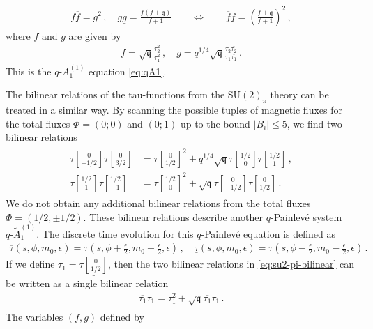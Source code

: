 \documentclass[11pt, a4paper]{article}
\newcommand{\tauftn}[2]{\tau\genfrac[]{0pt}{1}{#1}{#2}}
\theoremstyle{definition}
\begin{document}
\begin{align}
    f\overline{f} = g^2 \, , \quad
    g\underline{g} = \frac{f(f+\mathfrak{q})}{f+1} \qquad \Leftrightarrow \qquad
    \overline{f}\underline{f} = \left( \frac{f+\mathfrak{q}}{f+1} \right)^2 \, ,
\end{align}
where $ f $ and $ g $ are given by
\begin{align}
    f = \sqrt{\mathfrak{q}} \frac{\tau_2^2}{\tau_1^2} \, , \quad
    g = q^{1/4} \sqrt{\mathfrak{q}} \frac{\tau_2 \overline{\tau_2}}{\tau_1 \overline{\tau_1}} \, .
\end{align}
This is the $ q\text{-}A_1^{(1)} $ equation \eqref{eq:qA1}.

The bilinear relations of the tau-functions from the $ \mathrm{SU}(2)_\pi $ theory can be treated in a similar way. By scanning the possible tuples of magnetic fluxes for the total fluxes $ \Phi = (0;0) $ and $ (0;1) $ up to the bound $ |B_i| \leq 5 $, we find two bilinear relations
\begin{align}
    \begin{aligned}\label{eq:su2-pi-bilinear}
        \tauftn{0}{-1/2} \tauftn{0}{3/2} &= \tauftn{0}{1/2}^2 + q^{1/4} \sqrt{\mathfrak{q}} \tauftn{1/2}{0} \tauftn{1/2}{1} \, , \\
        \tauftn{1/2}{1} \tauftn{1/2}{-1} &= \tauftn{1/2}{0}^2 + \sqrt{\mathfrak{q}} \tauftn{0}{-1/2} \tauftn{0}{1/2} \, .
    \end{aligned}
\end{align}
We do not obtain any additional bilinear relations from the total fluxes $ \Phi = (1/2,\pm 1/2) $. These bilinear relations describe another $ q $-Painlev\'e system $ q\text{-}\tilde{A}_1^{(1)} $. The discrete time evolution for this $ q $-Painlev\'e equation is defined as \cite{Bershtein:2018srt}
\begin{align}
    \overline{\tau}(s,\phi,m_0,\epsilon) = \tau(s,\phi+\tfrac{\epsilon}{2}, m_0+\tfrac{\epsilon}{2},\epsilon) \, , \quad
    \underline{\tau}(s,\phi,m_0,\epsilon) = \tau(s,\phi-\tfrac{\epsilon}{2}, m_0-\tfrac{\epsilon}{2},\epsilon) \, .
\end{align}
If we define $ \tau_1 = \underline{\tauftn{0}{1/2}} $, then the two bilinear relations in \eqref{eq:su2-pi-bilinear} can be written as a single bilinear relation
\begin{align}
    \overline{\overline{\tau_1}} \underline{\underline{\tau_1}} = \tau_1^2 + \sqrt{\mathfrak{q}} \overline{\tau_1} \underline{\tau_1} \, .
\end{align}
The variables $ (f,g) $ defined by
\end{document}
